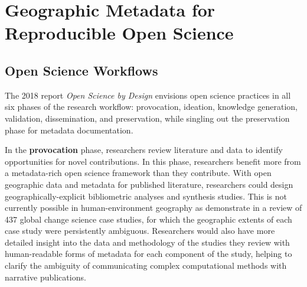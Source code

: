 \documentclass{isprs} %
\begin{document}
\section{Geographic Metadata for Reproducible Open Science}\label{sec:Background}

\subsection{Open Science Workflows}\label{sec:Workflow}

The 2018 \citeauthor{NASEM2018} report \textit{Open Science by Design} envisions open science practices in all six phases of the research workflow: provocation, ideation, knowledge generation, validation, dissemination, and preservation, while singling out the preservation phase for metadata documentation.

In the \textbf{provocation} phase, researchers review literature and data to identify opportunities for novel contributions.
In this phase, researchers benefit more from a metadata-rich open science framework than they contribute.
With open geographic data and metadata for published literature, researchers could design geographically-explicit bibliometric analyses and synthesis studies.
This is not currently possible in human-environment geography as \citet{Margulies2016} demonstrate in a review of 437 global change science case studies, for which the geographic extents of each case study were persistently ambiguous. 
Researchers would also have more detailed insight into the data and methodology of the studies they review with human-readable forms of metadata for each component of the study, helping to clarify the ambiguity of communicating complex computational methods with narrative publications.
\end{document}
